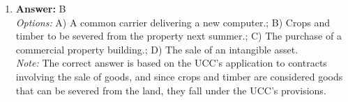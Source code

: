 \documentclass[12pt]{article}
\begin{document}
\begin{enumerate}[label=\arabic*.]
\\ \textit{Note:} The correct answer is "a or b" because, under the Fifth Amendment, if a regulation constitutes a taking of private property, the government is required to either provide just compensation to the property owner or demonstrate a legitimate public purpose for the taking.
\item \textbf{Answer:} B
\\ \textit{Options:} A) A common carrier delivering a new computer.; B) Crops and timber to be severed from the property next summer.; C) The purchase of a commercial property building.; D) The sale of an intangible asset.
\\ \textit{Note:} The correct answer is based on the UCC's application to contracts involving the sale of goods, and since crops and timber are considered goods that can be severed from the land, they fall under the UCC's provisions.
\end{enumerate}
\end{document}
